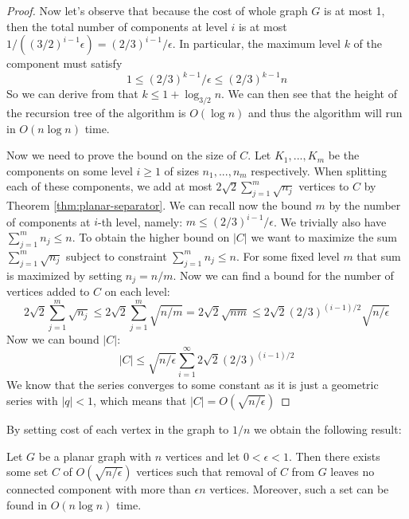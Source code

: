 \begin{proof}
    Now let's observe that because the cost of whole
	graph $G$ is at most 1, then the total number of components at level $i$
	is at most $1 / ((3/2)^{i-1} \epsilon) = (2/3) ^ {i-1} / \epsilon$.
	In particular, the maximum level $k$ of the component must satisfy
	$$ 1 \leq (2/3) ^ {k-1} / \epsilon \leq (2/3) ^ {k-1} n $$
	So we can derive
	from that $k \leq 1 + \log_{3/2} n$. We can then see that the height of the
	recursion tree of the algorithm is $O(\log n)$ and thus the algorithm will run in $O(n \log n)$ time.

	Now we need to prove the bound on the size of $C$. Let $K_1, ..., K_m$ be the
	components on some level $i \geq 1$ of sizes $n_1, ..., n_m$ respectively.
	When splitting each of these components, we add at most $2\sqrt{2} \sum_{j=1}
		^{m} \sqrt{n_j}$ vertices to $C$ by Theorem \ref{thm:planar-separator}. We
	can recall now the bound $m$ by the number of components at $i$-th level,
	namely: $m \leq (2/3)^{i-1} / \epsilon$. We trivially also have $ \sum_{j=1}^{m} n_j \leq n$.
	To obtain the higher bound on $|C|$ we want to maximize the sum $\sum_{j=1}^m
		\sqrt{n_j}$ subject to constraint $ \sum_{j=1}^{m} n_j \leq n$. For some fixed
	level $m$ that sum is maximized by setting $n_j = n / m$. Now we can find a
	bound for the number of vertices added to $C$ on each level:
	$$
		2\sqrt{2} \sum_{j=1}^m \sqrt{n_j} \leq 2\sqrt{2} \sum_{j=1}^m \sqrt{n/m}
		= 2\sqrt{2} \sqrt{nm} \leq 2\sqrt{2} (2/3) ^ {(i-1)/2} \sqrt{n / \epsilon}
	$$
	Now we can bound $|C|$:
	$$
		|C| \leq \sqrt{n / \epsilon} \sum_{i=1}^\infty 2\sqrt{2} (2/3) ^ {(i-1)/2}
	$$
	We know that the series converges to some constant as it is just a geometric series with $|q| < 1$, which means that $|C| = O(\sqrt{n/\epsilon})$
\end{proof}
\noindent
By setting cost of each vertex in the graph to $1/n$ we obtain the following result:
\begin{corollary} \cite{chibaApplicationsLiptonTarjans1981} \label{cor:epsilon-planar-separator}
	Let $G$ be a planar graph with $n$ vertices and let $0 < \epsilon < 1$. Then
	there exists some set $C$ of $O(\sqrt{n/ \epsilon})$ vertices such that
	removal of $C$ from $G$ leaves no connected component with
	more than $\epsilon n$ vertices. Moreover, such a set can be found in $O(n\log n)$ time.
\end{corollary}

